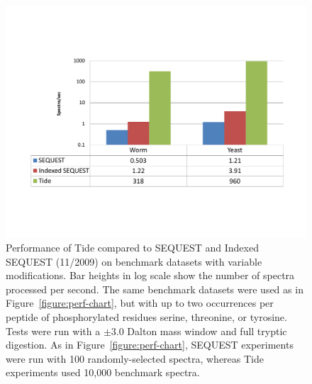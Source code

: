 \begin{figure}
\centering
\includegraphics[width=6.5in]{timing_chart_mods-cropped.pdf}
\caption{Performance of Tide compared to SEQUEST and Indexed SEQUEST
  (11/2009) on benchmark datasets with variable modifications. Bar
  heights in log scale show the number of spectra processed per
  second.  The same benchmark datasets were used as in
  Figure~\ref{figure:perf-chart}, but with up to two occurrences per
  peptide of phosphorylated residues serine, threonine, or
  tyrosine. Tests were run with a $\pm3.0$ Dalton mass window and full
  tryptic digestion. As in Figure~\ref{figure:perf-chart}, SEQUEST
  experiments were run with 100 randomly-selected spectra, whereas Tide
  experiments used 10,000 benchmark spectra.
  \label{figure:perf-chart-mods}}
\end{figure}


